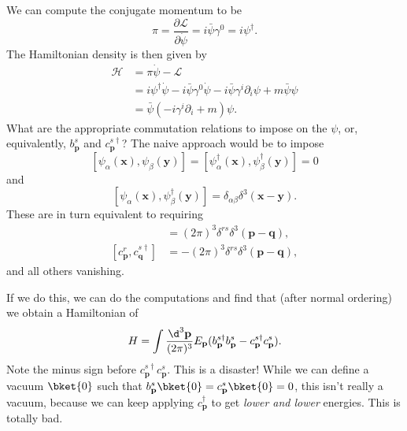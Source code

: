 \documentclass[a4paper]{article}
\begin{document}
We can compute the conjugate momentum to be
\[
  \pi = \frac{\partial \mathcal{L}}{\partial \dot\psi} = i \bar\psi \gamma^0 = i \psi^\dagger.
\]
The Hamiltonian density is then given by
\begin{align*}
  \mathcal{H} &= \pi \dot\psi - \mathcal{L} \\
  &= i\psi^\dagger \dot\psi - i \bar\psi \gamma^0 \dot\psi - i \bar\psi \gamma^i \partial_i \psi + m \bar\psi \psi\\
  &= \bar\psi(-i \gamma^i \partial_i + m) \psi.
\end{align*}
What are the appropriate commutation relations to impose on the $\psi$, or, equivalently, $b_\mathbf{p}^s$ and $c_\mathbf{p}^{s\dagger}$? The naive approach would be to impose
\[
  [\psi_\alpha(\mathbf{x}), \psi_\beta(\mathbf{y})] = [\psi_\alpha^\dagger(\mathbf{x}), \psi^\dagger_\beta(\mathbf{y})] = 0
\]
and
\[
  [\psi_\alpha(\mathbf{x}), \psi_\beta^\dagger(\mathbf{y})] = \delta_{\alpha\beta}\delta^3(\mathbf{x} - \mathbf{y}).
\]
These are in turn equivalent to requiring
\begin{align*}
  [b_\mathbf{p}^r, b_\mathbf{q}^{s\dagger}] &= (2\pi)^3 \delta^{rs}\delta^3(\mathbf{p} - \mathbf{q}),\\
  [c_\mathbf{p}^r, c_\mathbf{q}^{s\dagger}] &= -(2\pi)^3 \delta^{rs} \delta^3(\mathbf{p} - \mathbf{q}),
\end{align*}
and all others vanishing.

If we do this, we can do the computations and find that (after normal ordering) we obtain a Hamiltonian of
\[
  H = \int \frac{\d^3 \mathbf{p}}{(2\pi)^3} E_\mathbf{p}(b_\mathbf{p}^{s\dagger}b_\mathbf{p}^s - c_\mathbf{p}^{s\dagger}c_\mathbf{p}^s).
\]
Note the minus sign before $c_\mathbf{p}^{s\dagger}c_\mathbf{p}^s$. This is a disaster! While we can define a vacuum $\bket{0}$ such that $b_\mathbf{p}^s \bket{0} = c_\mathbf{p}^s \bket{0} = 0$, this isn't really a vacuum, because we can keep applying $c_\mathbf{p}^\dagger$ to get \emph{lower and lower} energies. This is totally bad.
\end{document}
